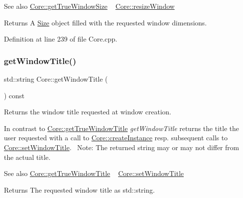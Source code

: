 \begin{DoxySeeAlso}{See also}
\hyperlink{classbkengine_1_1Core_a5238bcd142db1cb5a15cd3d6733a92da}{Core\+::get\+True\+Window\+Size} ~\newline
 \hyperlink{classbkengine_1_1Core_a88b8c671689df472845515953b5b7b2d}{Core\+::resize\+Window} 
\end{DoxySeeAlso}
\begin{DoxyReturn}{Returns}
A \hyperlink{structbkengine_1_1Size}{Size} object filled with the requested window dimensions. 
\end{DoxyReturn}


Definition at line 239 of file Core.\+cpp.

\mbox{\label{classbkengine_1_1Core_a0c42cf916f6232e384ea6d7f326becd9}} 
\subsubsection{\texorpdfstring{get\+Window\+Title()}{getWindowTitle()}}
{\footnotesize\ttfamily std\+::string Core\+::get\+Window\+Title (\begin{DoxyParamCaption}{ }\end{DoxyParamCaption}) const}



Returns the window title requested at window creation. 

In contrast to \hyperlink{classbkengine_1_1Core_a9fa654f1b1391876dbf77349f979e106}{Core\+::get\+True\+Window\+Title} {\itshape get\+Window\+Title} returns the title the user requested with a call to \hyperlink{classbkengine_1_1Core_a8b809ebbd1348ae9b59d49388e7a18f0}{Core\+::create\+Instance} resp. subsequent calls to \hyperlink{classbkengine_1_1Core_a6c510c45e9463399359664965918b431}{Core\+::set\+Window\+Title}.~\newline
Note\+: The returned string may or may not differ from the actual title.

\begin{DoxySeeAlso}{See also}
\hyperlink{classbkengine_1_1Core_a9fa654f1b1391876dbf77349f979e106}{Core\+::get\+True\+Window\+Title} ~\newline
 \hyperlink{classbkengine_1_1Core_a6c510c45e9463399359664965918b431}{Core\+::set\+Window\+Title} 
\end{DoxySeeAlso}
\begin{DoxyReturn}{Returns}
The requested window title as std\+::string. 
\end{DoxyReturn}


